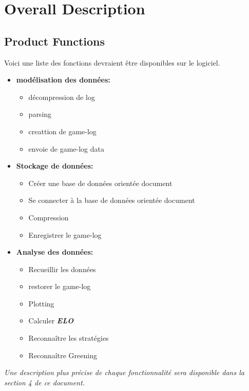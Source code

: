 \documentclass{scrreprt}
\begin{document}
\chapter{Overall Description}


\section{Product Functions}

Voici une liste des fonctions devraient être disponibles sur le logiciel.
\begin{itemize}


  \item{\textbf{modélisation des données:}}
    \begin{itemize}
    \item{décompression de log}
    \item{parsing}
    \item{creattion de game-log}
    \item{envoie de game-log data}
    \end{itemize}
  \item{\textbf{Stockage de données:}}
    \begin{itemize}
    \item{Créer une base de données orientée document}
    \item{Se connecter à la base de données orientée document}
    \item{Compression}
    \item{Enregistrer le game-log}
    \end{itemize}
  \item{\textbf{Analyse des données:}}
    \begin{itemize}
      \item{Recueillir les données}
      \item{restorer le game-log}
      \item{Plotting}
      \item{Calculer \textit{\textbf{ELO}}}
      \item{Reconnaître les stratégies}
      \item{Reconnaître Greening}
    \end{itemize}
\end{itemize}
\textit{ Une description plus précise de chaque fonctionnalité sera disponible dans la section 4 de ce document. }
\end{document}
